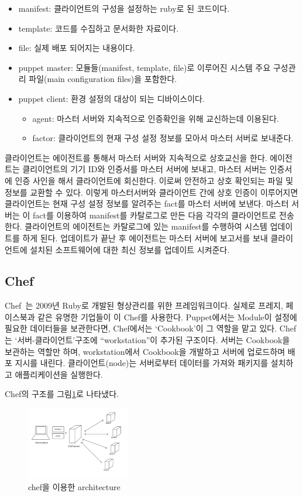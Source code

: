 \documentclass{pnu-survey}
\begin{document}
\begin{itemize}[itemsep=0pt,parsep=0pt]
    \item manifest: 클라이언트의 구성을 설정하는 ruby로 된 코드이다.
    \item template: 코드를 수집하고 문서화한 자료이다.
    \item file: 실제 배포 되어지는 내용이다.
    \item puppet master: 모듈들(manifest, template, file)로 이루어진 시스템 주요 구성관리 파일(main configuration files)을 포함한다.
    \item puppet client: 환경 설정의 대상이 되는 디바이스이다.
    \begin{itemize}
        \item agent: 마스터 서버와 지속적으로 인증확인을 위해 교신하는데 이용된다.
        \item factor: 클라이언트의 현재 구성 설정 정보를 모아서 마스터 서버로 보내준다.
    \end{itemize}
\end{itemize}

클라이언트는 에이전트를 통해서 마스터 서버와 지속적으로 상호교신을 한다. 
에이전트는 클리이언트의 기기 ID와 인증서를 마스터 서버에 보내고, 마스터 서버는 인증서에 인증 사인을 해서 클라이언트에 회신한다. 이로써 안전하고 상호 확인되는 파일 및 정보를 교환할 수 있다.
이렇게 마스터서버와 클라이언트 간에 상호 인증이 이루어지면 클라이언트는 현재 구성 설정 정보를 알려주는 fact를 마스터 서버에 보낸다. 마스터 서버는 이 fact를 이용하여 manifest를 카탈로그로 만든 다음 각각의 클라이언트로 전송한다. 클라이언트의 에이전트는 카탈로그에 있는 manifest를 수행하여 시스템 업데이트를 하게 된다. 업데이트가 끝난 후 에이전트는 마스터 서버에 보고서를 보내 클라이언트에 설치된 소프트웨어에 대한 최신 정보를 업데이트 시켜준다.

\subsection{Chef}
Chef~\cite{chef}는 2009년 Ruby로 개발된 형상관리를 위한 프레임워크이다. 
실제로 프레지, 페이스북과 같은 유명한 기업들이 이 Chef를 사용한다. 
Puppet에서는 Module이 설정에 필요한 데이터들을 보관한다면, Chef에서는 ‘Cookbook’이 그 역할을 맡고 있다. 
Chef는 ‘서버-클라이언트’구조에 “workstation”이 추가된 구조이다. 
서버는 Cookbook을 보관하는 역할만 하며, workstation에서 Cookbook을 개발하고 서버에 업로드하며 배포 지시를 내린다.  
클라이언트(node)는 서버로부터 데이터를 가져와 패키지를 설치하고 애플리케이션을 실행한다.

Chef의 구조를 그림\ref{fig:chef}로 나타냈다. 
\begin{figure}[!ht]
\centering
\includegraphics[width=0.4\textwidth]{img/chef.jpg}
\caption{chef을 이용한 architecture}
\label{fig:chef}
\end{figure}
\end{document}
